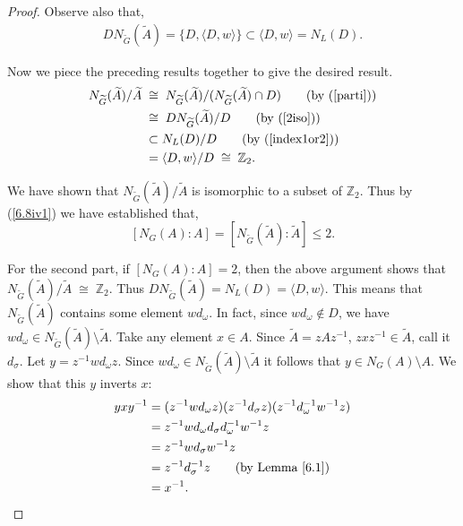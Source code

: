 \documentclass[a4paper , 11pt]{book}
\theoremstyle{definition}
\theoremstyle{remark}
\begin{document}
\begin{proof}
Observe also that, 
\begin{align}\label{index1or2} DN_{\widetilde{G}}({\widetilde{A}}) = \{ D, \langle D, w \rangle \} \subset \langle D, w \rangle = N_L(D).
\end{align}

Now we piece the preceding results together to give the desired result.
\begin{align*}  N_{\widetilde{G}}({\widetilde{A}}) / {\widetilde{A}} \; & \cong \;  N_{\widetilde{G}}({\widetilde{A}})/( N_{\widetilde{G}}({\widetilde{A}}) \cap D) \tag{by (\ref{parti})}
\\ & \cong \; DN_{\widetilde{G}}({\widetilde{A}}) / D \tag{by (\ref{2iso})}
\\ & \subset N_L(D) / D \tag{by (\ref{index1or2})}
\\ &= \langle D, w \rangle / D \; \cong \; \mathbb{Z}_2.
\end{align*}

We have shown that $N_{\widetilde{G}}({\widetilde{A}}) / {\widetilde{A}}$ is isomorphic to a subset of $\mathbb{Z}_2$. Thus by (\ref{6.8iv1}) we have established that, $$[N_G(A): A] = [N_{\widetilde{G}}({\widetilde{A}}): {\widetilde{A}}] \leq 2.$$
\vspace{-2mm}

For the second part, if $[N_G(A): A] = 2$, then the above argument shows that $N_{\widetilde{G}}({\widetilde{A}}) / {\widetilde{A}} \; \cong \; \mathbb{Z}_2$. Thus $DN_{\widetilde{G}}({\widetilde{A}}) = N_L(D) = \langle D, w \rangle$. This means that $N_{\widetilde{G}}({\widetilde{A}})$ contains some element $wd_\omega$. In fact, since $w d_\omega \not \in D$, we have $w d_\omega \in N_{\widetilde{G}}({\widetilde{A}}) \! \setminus \! {\widetilde{A}}$. Take any element $x \in A$. Since ${\widetilde{A}} = zAz^{-1}$, $zxz^{-1} \in {\widetilde{A}}$, call it $d_\sigma$. Let $y = z^{-1}w d_\omega z$. Since $wd_\omega \in N_{\widetilde{G}}({\widetilde{A}}) \! \setminus \! {\widetilde{A}}$ it follows that $y \in N_G(A)\! \setminus \! A$. We show that this $y$ inverts $x$:
\begin{align*} yxy^{-1} &= (z^{-1}w d_\omega z)(z^{-1} d_\sigma z)(z^{-1}d^{-1}_\omega w^{-1} z)
\\ &= z^{-1} w d_\omega  d_\sigma d^{-1}_\omega w^{-1} z
\\ &=  z^{-1} w  d_\sigma  w^{-1} z 
\\ &=  z^{-1}  d^{-1}_\sigma z  \tag{by Lemma \ref{6.1}}
\\ &= x^{-1}.
\end{align*}


\end{proof}
\end{document}
